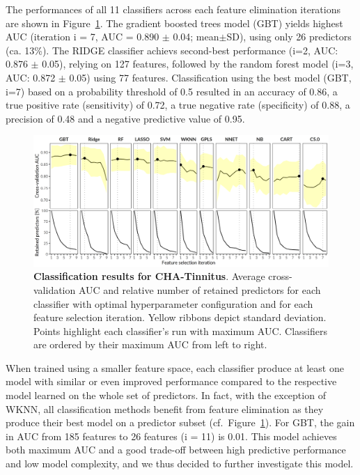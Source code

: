 \documentclass[
  oneside]{book}
\begin{document}
The performances of all 11 classifiers across each feature elimination iterations are shown in Figure~\ref{fig:09-results-pone}.
The gradient boosted trees model (GBT) yields highest AUC (iteration i = 7, AUC = 0.890 \(\pm\) 0.04; mean\(\pm\)SD), using only 26 predictors (ca. 13\%).
The RIDGE classifier achievs second-best performance (i=2, AUC: 0.876 \(\pm\) 0.05), relying on 127 features, followed by the random forest model (i=3, AUC: 0.872 \(\pm\) 0.05) using 77 features.
Classification using the best model (GBT, i=7) based on a probability threshold of 0.5 resulted in an accuracy of 0.86, a true positive rate (sensitivity) of 0.72, a true negative rate (specificity) of 0.88, a precision of 0.48 and a negative predictive value of 0.95.



\begin{figure}[htbp]

{\centering \includegraphics[width=1\linewidth]{figures/09-results-pone} 

}

\caption{\textbf{Classification results for CHA-Tinnitus}. Average cross-validation AUC and relative number of retained predictors for each classifier with optimal hyperparameter configuration and for each feature selection iteration. Yellow ribbons depict standard deviation. Points highlight each classifier's run with maximum AUC. Classifiers are ordered by their maximum AUC from left to right.}\label{fig:09-results-pone}
\end{figure}

When trained using a smaller feature space, each classifier produce at least one model with similar or even improved performance compared to the respective model learned on the whole set of predictors.
In fact, with the exception of WKNN, all classification methods benefit from feature elimination as they produce their best model on a predictor subset (cf.~Figure~\ref{fig:09-results-pone}).
For GBT, the gain in AUC from 185 features to 26 features (i = 11) is 0.01.
This model achieves both maximum AUC and a good trade-off between high predictive performance and low model complexity, and we thus decided to further investigate this model.
\end{document}

